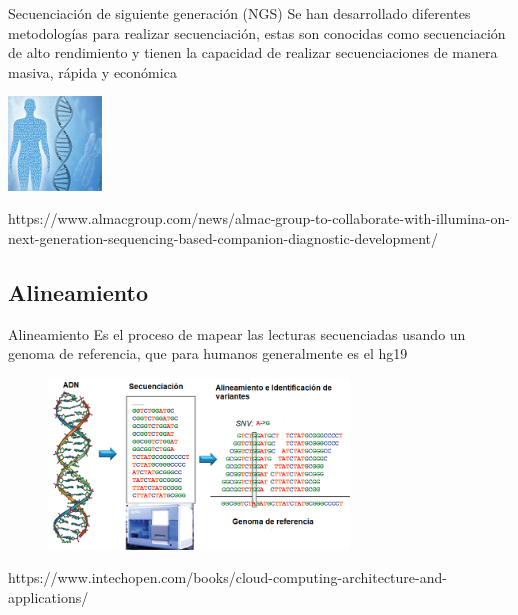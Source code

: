 \documentclass[xcolor=dvipsnames]{beamer}
\begin{document}


	
	

\begin{frame}{Secuenciación de siguiente generación (NGS)}	
	\justifying
	Se han desarrollado diferentes metodologías para realizar secuenciación, estas son conocidas como secuenciación de alto rendimiento y tienen la capacidad de realizar secuenciaciones de manera masiva, rápida y económica  \cite{Kulski2016} 
	
\hfill \break
	\centering
\includegraphics[width=25mm]{ngs.jpg}

\hfill \break

\justifying
\tiny{https://www.almacgroup.com/news/almac-group-to-collaborate-with-illumina-on-next-generation-sequencing-based-companion-diagnostic-development/}
	
\end{frame}


\subsection{Alineamiento}

\begin{frame}{Alineamiento}
	\justifying
	Es el proceso de mapear las lecturas secuenciadas usando un genoma de referencia, que para humanos generalmente es el hg19
	\hfill \break
	
	\begin{figure}
	\centering
	\includegraphics[width=8cm]{resumenngs.png}
	\end{figure}
\justifying
\tiny{https://www.intechopen.com/books/cloud-computing-architecture-and-applications/}	
\end{frame}
\end{document}
